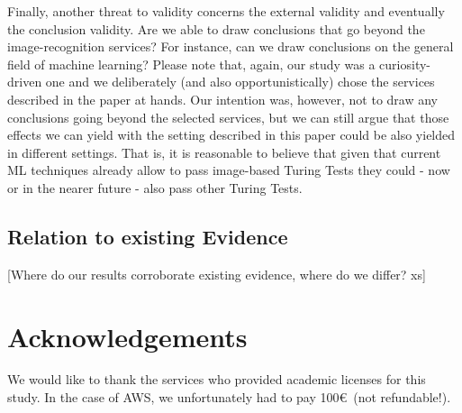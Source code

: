 \documentclass[sigconf,review,anonymous]{acmart}
\begin{document}
Finally, another threat to validity concerns the external validity and eventually the conclusion validity. Are we able to draw conclusions that go beyond the image-recognition services? For instance, can we draw conclusions on the general field of machine learning? Please note that, again, our study was a curiosity-driven one and we deliberately (and also opportunistically) chose the services described in the paper at hands. Our intention was, however, not to draw any conclusions going beyond the selected services, but we can still argue that those effects we can yield with the setting described in this paper could be also yielded in different settings. That is, it is reasonable to believe that given that current ML techniques already allow to pass image-based Turing Tests they could - now or in the nearer future - also pass other Turing Tests.


\subsection{Relation to existing Evidence}

[Where do our results corroborate existing evidence, where do we differ?  xs]

\section*{Acknowledgements}
We would like to thank the services who provided academic licenses for this study.
In the case of AWS, we unfortunately had to pay 100\euro~(not refundable!).



\end{document}
